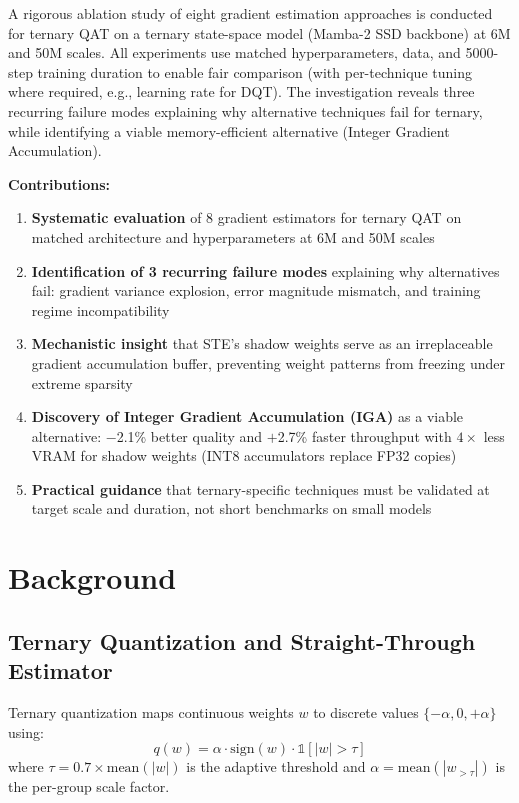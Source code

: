 \documentclass{article}
\begin{document}
A rigorous ablation study of eight gradient estimation approaches is conducted for ternary QAT on a ternary state-space model (Mamba-2 SSD backbone) at 6M and 50M scales. All experiments use matched hyperparameters, data, and 5000-step training duration to enable fair comparison (with per-technique tuning where required, e.g., learning rate for DQT). The investigation reveals three recurring failure modes explaining why alternative techniques fail for ternary, while identifying a viable memory-efficient alternative (Integer Gradient Accumulation).

\textbf{Contributions:}
\begin{enumerate}
    \item \textbf{Systematic evaluation} of 8 gradient estimators for ternary QAT on matched architecture and hyperparameters at 6M and 50M scales
    \item \textbf{Identification of 3 recurring failure modes} explaining why alternatives fail: gradient variance explosion, error magnitude mismatch, and training regime incompatibility
    \item \textbf{Mechanistic insight} that STE's shadow weights serve as an irreplaceable gradient accumulation buffer, preventing weight patterns from freezing under extreme sparsity
    \item \textbf{Discovery of Integer Gradient Accumulation (IGA)} as a viable alternative: $-$2.1\% better quality and $+$2.7\% faster throughput with $4\times$ less VRAM for shadow weights (INT8 accumulators replace FP32 copies)
    \item \textbf{Practical guidance} that ternary-specific techniques must be validated at target scale and duration, not short benchmarks on small models
\end{enumerate}

\section{Background}
\label{sec:background}

\subsection{Ternary Quantization and Straight-Through Estimator}

Ternary quantization maps continuous weights $w$ to discrete values $\{-\alpha, 0, +\alpha\}$ using:
\begin{equation}
q(w) = \alpha \cdot \text{sign}(w) \cdot \mathbb{1}[|w| > \tau]
\end{equation}
where $\tau = 0.7 \times \text{mean}(|w|)$ is the adaptive threshold and $\alpha = \text{mean}(|w_{>\tau}|)$ is the per-group scale factor.
\end{document}
